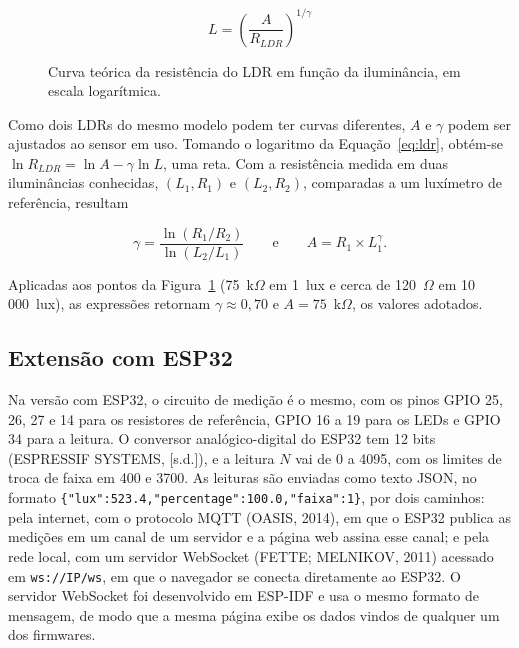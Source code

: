 \documentclass[11pt,a4paper]{article}
\begin{document}
\begin{equation}
	L = \left( \frac{A}{R_{LDR}} \right)^{1/\gamma}
	\label{eq:lux}
\end{equation}

\begin{figure}[htbp]
	\centering
	
	\caption{Curva teórica da resistência do LDR em função da iluminância, em escala logarítmica.}
	\label{fig:ldr}
\end{figure}

Como dois LDRs do mesmo modelo podem ter curvas diferentes, $A$ e $\gamma$ podem ser ajustados ao sensor em uso. Tomando o logaritmo da Equação~\ref{eq:ldr}, obtém-se $\ln R_{LDR} = \ln A - \gamma \ln L$, uma reta. Com a resistência medida em duas iluminâncias conhecidas, $(L_1, R_1)$ e $(L_2, R_2)$, comparadas a um luxímetro de referência, resultam

\begin{equation}
	\gamma = \frac{\ln(R_1/R_2)}{\ln(L_2/L_1)}
	\qquad\text{e}\qquad
	A = R_1 \times L_1^{\gamma}.
	\label{eq:calibracao}
\end{equation}

\noindent Aplicadas aos pontos da Figura~\ref{fig:ldr} (75~k$\Omega$ em 1~lux e cerca de 120~$\Omega$ em 10\,000~lux), as expressões retornam $\gamma \approx 0{,}70$ e $A = 75$~k$\Omega$, os valores adotados.

\subsection*{Extensão com ESP32}

Na versão com ESP32, o circuito de medição é o mesmo, com os pinos GPIO 25, 26, 27 e 14 para os resistores de referência, GPIO 16 a 19 para os LEDs e GPIO 34 para a leitura. O conversor analógico-digital do ESP32 tem 12 bits (ESPRESSIF SYSTEMS, [s.d.]), e a leitura $N$ vai de 0 a 4095, com os limites de troca de faixa em 400 e 3700. As leituras são enviadas como texto JSON, no formato \texttt{\{"lux":523.4,"percentage":100.0,"faixa":1\}}, por dois caminhos: pela internet, com o protocolo MQTT (OASIS, 2014), em que o ESP32 publica as medições em um canal de um servidor e a página web assina esse canal; e pela rede local, com um servidor WebSocket (FETTE; MELNIKOV, 2011) acessado em \texttt{ws://IP/ws}, em que o navegador se conecta diretamente ao ESP32. O servidor WebSocket foi desenvolvido em ESP-IDF e usa o mesmo formato de mensagem, de modo que a mesma página exibe os dados vindos de qualquer um dos firmwares.
\end{document}
